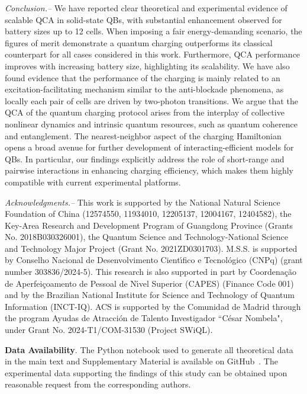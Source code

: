 \documentclass[aps,prl,epsfigure,twocolumn,superscriptaddress]{revtex4-2}
\newcommand{\1}{\mathbbm{1}}
\newcommand{\RefB}[1]{{\color{black}#1}}
\newcommand{\RefC}[1]{{\color{black}#1}}
\begin{document}
	\emph{Conclusion.--} We have reported clear theoretical and experimental evidence \RefC{of scalable QCA} in solid-state QBs, with substantial enhancement observed for battery sizes up to 12 cells. When imposing a fair energy-demanding scenario, the figures of merit demonstrate a quantum charging outperforms its classical counterpart for all cases considered in this work. Furthermore, QCA performance improves with increasing battery size, highlighting its scalability. We have also found evidence that the performance of the charging is mainly related to an excitation-facilitating mechanism similar to the anti-blockade phenomena, as locally each pair of cells are driven by two-photon transitions.	\RefB{We argue that  the QCA of the quantum charging protocol arises from the interplay of collective nonlinear dynamics and intrinsic quantum resources, such as quantum coherence and entanglement.} The nearest-neighbor aspect of the charging Hamiltonian opens a broad avenue for further development of interacting-efficient models for QBs. In particular, our findings explicitly address the role of short-range and pairwise interactions in enhancing charging efficiency, which makes them highly compatible with current experimental platforms.

	\begin{acknowledgments}
	\textit{Acknowledgments.--} This work is supported by the National Natural Science Foundation of China (12574550, 11934010, 12205137, 12004167, 12404582), the Key-Area Research and Development Program of Guangdong Province (Grants No. 2018B030326001),  the Quantum Science and Technology-National Science and Technology Major Project (Grant No. 2021ZD0301703). M.S.S. is supported by Conselho Nacional de Desenvolvimento Cient\'{\i}fico e Tecnol\'ogico (CNPq) (grant number 303836/2024-5).
	This research is also supported in part by Coordena\c{c}\~ao de Aperfei\c{c}oamento de Pessoal de N\'{\i}vel Superior (CAPES) (Finance Code 001)
	and by the Brazilian National Institute for Science and Technology of Quantum Information (INCT-IQ). ACS is supported by the Comunidad de Madrid through the program Ayudas de Atracción de Talento Investigador ``César Nombela", under Grant No. 2024-T1/COM-31530 (Project SWiQL).
	\end{acknowledgments}



	\textbf{Data Availability}. The Python notebook used to generate all theoretical data in the main text and Supplementary Material is available on GitHub~\cite{GitHub_SQB}. The experimental data supporting the findings of this study can be obtained upon reasonable request from the corresponding authors.
\end{document}

